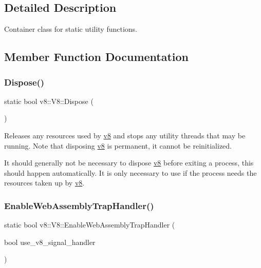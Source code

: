 \subsection{Detailed Description}
Container class for static utility functions. 

\subsection{Member Function Documentation}
\mbox{\label{classv8_1_1V8_a566450d632c0a63770682b9da3cae08d}} 
\subsubsection{\texorpdfstring{Dispose()}{Dispose()}}
{\footnotesize\ttfamily static bool v8\+::\+V8\+::\+Dispose (\begin{DoxyParamCaption}{ }\end{DoxyParamCaption})\hspace{0.3cm}{\ttfamily [static]}}

Releases any resources used by \mbox{\hyperlink{namespacev8}{v8}} and stops any utility threads that may be running. Note that disposing \mbox{\hyperlink{namespacev8}{v8}} is permanent, it cannot be reinitialized.

It should generally not be necessary to dispose \mbox{\hyperlink{namespacev8}{v8}} before exiting a process, this should happen automatically. It is only necessary to use if the process needs the resources taken up by \mbox{\hyperlink{namespacev8}{v8}}. \mbox{\label{classv8_1_1V8_a3a21191d183bf7b1235d029e6fdf438f}} 
\subsubsection{\texorpdfstring{Enable\+Web\+Assembly\+Trap\+Handler()}{EnableWebAssemblyTrapHandler()}}
{\footnotesize\ttfamily static bool v8\+::\+V8\+::\+Enable\+Web\+Assembly\+Trap\+Handler (\begin{DoxyParamCaption}\item[{bool}]{use\+\_\+v8\+\_\+signal\+\_\+handler }\end{DoxyParamCaption})\hspace{0.3cm}{\ttfamily [static]}}

